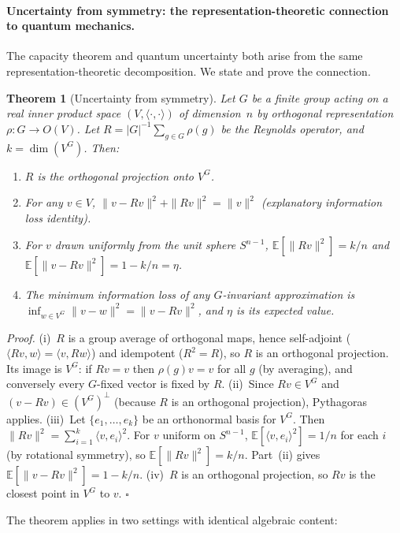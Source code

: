 \documentclass[11pt,a4paper]{article}
\newtheorem{theorem}{Theorem}[section]
\begin{document}
\paragraph{Uncertainty from symmetry: the representation-theoretic connection to quantum mechanics.}
The capacity theorem and quantum uncertainty both arise from the same representation-theoretic decomposition.  We state and prove the connection.

\begin{theorem}[Uncertainty from symmetry]
\label{thm:uncertainty-from-symmetry}
Let $G$ be a finite group acting on a real inner product space $(V, \langle\cdot,\cdot\rangle)$ of dimension~$n$ by orthogonal representation $\rho : G \to O(V)$.  Let $R = |G|^{-1} \sum_{g \in G} \rho(g)$ be the Reynolds operator, and $k = \dim(V^G)$.  Then:
\begin{enumerate}
  \item[(i)] $R$ is the orthogonal projection onto $V^G$.
  \item[(ii)] For any $v \in V$, $\|v - Rv\|^2 + \|Rv\|^2 = \|v\|^2$ \emph{(explanatory information loss identity)}.
  \item[(iii)] For $v$ drawn uniformly from the unit sphere $S^{n-1}$, $\mathbb{E}[\|Rv\|^2] = k/n$ and $\mathbb{E}[\|v - Rv\|^2] = 1 - k/n = \eta$.
  \item[(iv)] The minimum information loss of any $G$-invariant approximation is $\inf_{w \in V^G} \|v - w\|^2 = \|v - Rv\|^2$, and $\eta$ is its expected value.
\end{enumerate}
\end{theorem}

\emph{Proof.}
(i)~$R$ is a group average of orthogonal maps, hence self-adjoint ($\langle Rv, w\rangle = \langle v, Rw\rangle$) and idempotent ($R^2 = R$), so $R$ is an orthogonal projection.  Its image is $V^G$: if $Rv = v$ then $\rho(g)v = v$ for all $g$ (by averaging), and conversely every $G$-fixed vector is fixed by $R$.
(ii)~Since $Rv \in V^G$ and $(v - Rv) \in (V^G)^\perp$ (because $R$ is an orthogonal projection), Pythagoras applies.
(iii)~Let $\{e_1, \ldots, e_k\}$ be an orthonormal basis for $V^G$.  Then $\|Rv\|^2 = \sum_{i=1}^k \langle v, e_i\rangle^2$.  For $v$ uniform on $S^{n-1}$, $\mathbb{E}[\langle v, e_i\rangle^2] = 1/n$ for each $i$ (by rotational symmetry), so $\mathbb{E}[\|Rv\|^2] = k/n$.  Part~(ii) gives $\mathbb{E}[\|v - Rv\|^2] = 1 - k/n$.
(iv)~$R$ is an orthogonal projection, so $Rv$ is the closest point in $V^G$ to $v$.  \hfill$\square$

The theorem applies in two settings with identical algebraic content:
\end{document}
